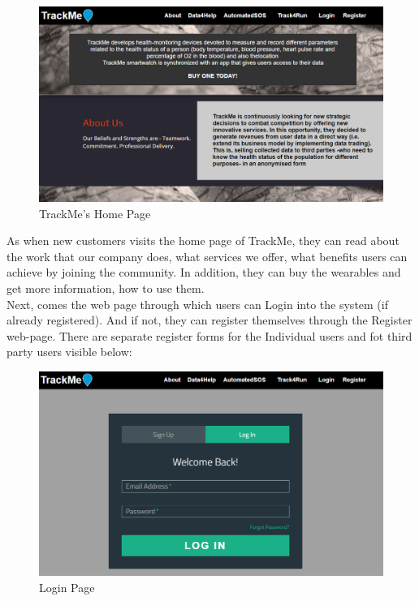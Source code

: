 \documentclass[a4paper, hidelinks, 12pt]{report}
\begin{document}
	\begin{figure}[H]
		\centering
		\includegraphics[scale=0.4]{../Assets/Home_Page.png}
		\caption[UI: TrackMe's Home Page]{TrackMe's Home Page}
		\label{fig:Home_Page}
	\end{figure}
	
	As when new customers visits the home page of TrackMe, they can read about the work that our company does, what services we offer, what benefits users can achieve by joining the community. In addition, they can buy the wearables and get more information, how to use them.\\
	
	Next, comes the web page through which users can Login into the system (if already registered). And if not, they can register themselves through the Register web-page. There are separate register forms for the Individual users and fot third party users visible below:
	
	\begin{figure}[H]
		\centering
		\includegraphics[scale=0.35]{../Assets/Login.png}
		\caption[UI: Login Page]{Login Page}
		\label{fig:Login}
	\end{figure}
	
\end{document}
